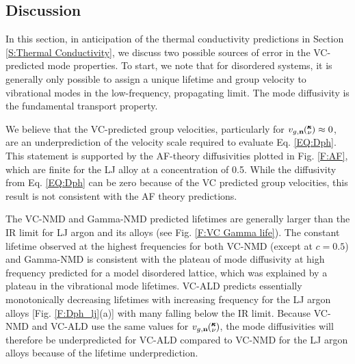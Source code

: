 \documentclass[12pt,twocolumn,iop]{/usr/share/texmf-texlive/tex/latex/iop/iopart}[/usr/share/texmf-texlive/tex/latex/iop/]
\newcommand{\kv}{\mspace{-4.0mu}\left(\mspace{-8.0mu}
\begin{smallmatrix}&\pmb{\kappa} \\&\nu\end{smallmatrix}
\mspace{-3.0mu}\right)}
\begin{document}
\clearpage

\subsection{\label{S:Discussion}Discussion}

In this section, in anticipation of the thermal conductivity predictions 
in Section \ref{S:Thermal Conductivity}, we discuss two possible sources 
of error in the VC-predicted mode properties. 
To start, we note that for disordered systems, it is generally only 
possible to assign a 
unique lifetime and group velocity to vibrational modes  
in the low-frequency, propagating limit.
\cite{feldman_numerical_1999,xu_energy_2009} The mode diffusivity 
is the fundamental transport property.
\cite{allen_thermal_1993,feldman_thermal_1993,feldman_numerical_1999} 

We believe that the VC-predicted group velocities, particularly 
for $v_{g,\mathbf{n}}\kv \approx 0$, are an underprediction of the 
velocity scale required to evaluate Eq. \eqref{EQ:Dph}.  
This statement is supported by the 
AF-theory diffusivities plotted in Fig. \ref{F:AF}, 
which are finite for the LJ alloy at a concentration 
of 0.5. While the diffusivity from Eq. \eqref{EQ:Dph} can be 
zero because of the VC predicted group velocities, this result is not 
consistent with the AF theory predictions.

The VC-NMD and Gamma-NMD predicted lifetimes are generally larger 
than the IR limit  
for LJ argon and its alloys (see Fig. \ref{F:VC Gamma life}). 
The constant lifetime observed at the highest frequencies  
for both VC-NMD (except at $c=0.5$) and Gamma-NMD is 
consistent with the plateau of mode diffusivity at high 
frequency predicted for a model disordered lattice, 
which was explained by a plateau in the vibrational mode lifetimes.
\cite{sheng_heat_1991} 
VC-ALD predicts essentially monotonically 
decreasing lifetimes with increasing frequency for the LJ argon 
alloys [Fig. \ref{F:Dph_lj}(a)] with many falling below the IR limit. 
Because VC-NMD and VC-ALD use the same values for 
$v_{g,\mathbf{n}}\kv$, the 
mode diffusivities will therefore be underpredicted for 
VC-ALD compared to VC-NMD for the LJ argon alloys because of the 
lifetime underprediction. 

\end{document}
